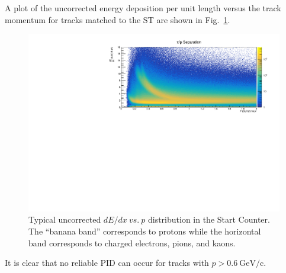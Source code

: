 A plot of the uncorrected energy deposition per unit length versus the track momentum for tracks matched to the ST are shown in Fig.~\ref{fig:dEdx_vs_p_uncorr}.
	\begin{figure}[!htb]
	\centering
	\includegraphics[width=1.0\columnwidth]{calibration/figs/NoCorr_ATT}
	\caption{Typical uncorrected $dE/dx\ vs.\ p$ distribution in the Start Counter.  The ``banana band'' corresponds to protons while the horizontal band corresponds to charged electrons, pions, and kaons.}
	\label{fig:dEdx_vs_p_uncorr}
	\end{figure}  
It is clear that no reliable PID can occur for tracks with $p > 0.6\ \mathrm{GeV/c}$.

